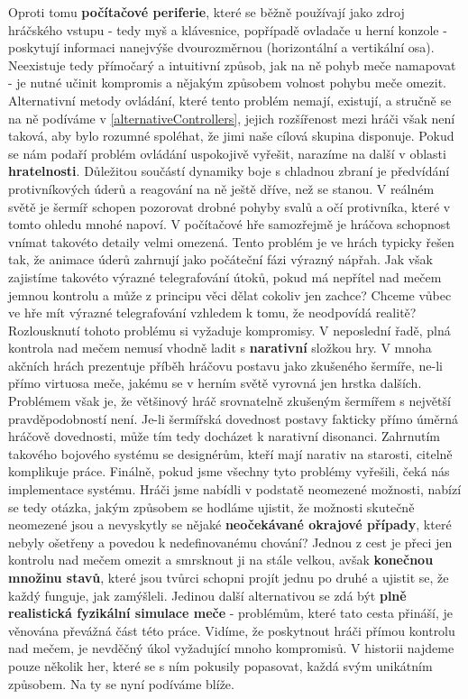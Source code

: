Oproti tomu \textbf{počítačové periferie}, které se běžně používají jako zdroj hráčského vstupu - tedy myš a klávesnice, popřípadě ovladače u herní konzole - poskytují informaci nanejvýše dvourozměrnou (horizontální a vertikální osa). Neexistuje tedy přímočarý a intuitivní způsob, jak na ně pohyb meče namapovat - je nutné učinit kompromis a nějakým způsobem volnost pohybu meče omezit. Alternativní metody ovládání, které tento problém nemají, existují, a stručně se na ně podíváme v \ref{alternativeControllers}, jejich rozšířenost mezi hráči však není taková, aby bylo rozumné spoléhat, že jimi naše cílová skupina disponuje.
\bigbreak
Pokud se nám podaří problém ovládání uspokojivě vyřešit, narazíme na další v oblasti \textbf{hratelnosti}. Důležitou součástí dynamiky boje s chladnou zbraní je předvídání protivníkových úderů a reagování na ně ještě dříve, než se stanou. V reálném světě je šermíř schopen pozorovat drobné pohyby svalů a očí protivníka, které v tomto ohledu mnohé napoví. V počítačové hře samozřejmě je hráčova schopnost vnímat takovéto detaily velmi omezená. Tento problém je ve hrách typicky řešen tak, že animace úderů zahrnují jako počáteční fázi výrazný nápřah. Jak však zajistíme takovéto výrazné telegrafování útoků, pokud má nepřítel nad mečem jemnou kontrolu a může z principu věci dělat cokoliv jen zachce? Chceme vůbec ve hře mít výrazné telegrafování vzhledem k tomu, že neodpovídá realitě? Rozlousknutí tohoto problému si vyžaduje kompromisy.
\bigbreak
V neposlední řadě, plná kontrola nad mečem nemusí vhodně ladit s \textbf{narativní} složkou hry. V mnoha akčních hrách prezentuje příběh hráčovu postavu jako zkušeného šermíře, ne-li přímo virtuosa meče, jakému se v herním světě vyrovná jen hrstka dalších. Problémem však je, že většinový hráč srovnatelně zkušeným šermířem s největší pravděpodobností není. Je-li šermířská dovednost postavy fakticky přímo úměrná hráčově dovednosti, může tím tedy docházet k narativní disonanci. Zahrnutím takového bojového systému se designérům, kteří mají narativ na starosti, citelně komplikuje práce. 
\bigbreak
Finálně, pokud jsme všechny tyto problémy vyřešili, čeká nás implementace systému. Hráči jsme nabídli v podstatě neomezené možnosti, nabízí se tedy otázka, jakým způsobem se hodláme ujistit, že možnosti skutečně neomezené jsou a nevyskytly se nějaké \textbf{neočekávané okrajové případy}, které nebyly ošetřeny a povedou k nedefinovanému chování? Jednou z cest je přeci jen kontrolu nad mečem omezit a smrsknout ji na stále velkou, avšak \textbf{konečnou množinu stavů}, které jsou tvůrci schopni projít jednu po druhé a ujistit se, že každý funguje, jak zamýšleli. Jedinou další alternativou se zdá být \textbf{plně realistická fyzikální simulace meče} - problémům, které tato cesta přináší, je věnována převážná část této práce.  
\bigbreak
Vidíme, že poskytnout hráči přímou kontrolu nad mečem, je nevděčný úkol vyžadující mnoho kompromisů. V historii najdeme pouze několik her, které se s ním pokusily popasovat, každá svým unikátním způsobem. Na ty se nyní podíváme blíže.

